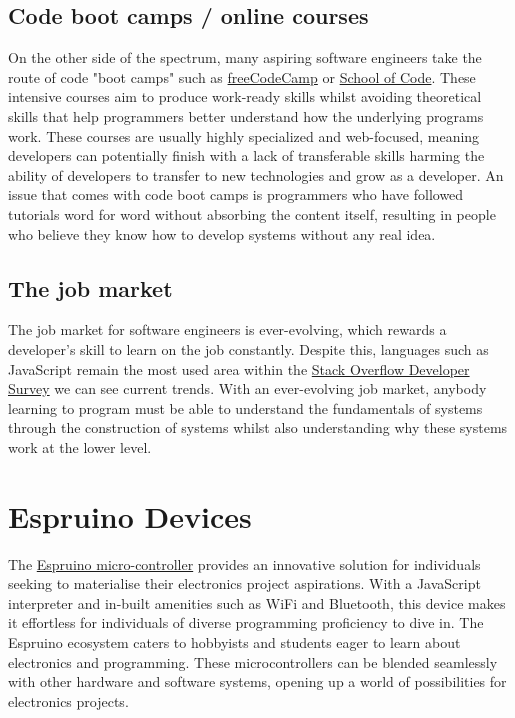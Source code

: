 \documentclass{l4proj}
\begin{document}
\subsection{Code boot camps / online courses}
On the other side of the spectrum, many aspiring software engineers take the route of code "boot camps" such as \href{https://www.freecodecamp.org/}{freeCodeCamp} or \href{https://www.schoolofcode.co.uk/}{School of Code}. These intensive courses aim to produce work-ready skills whilst avoiding theoretical skills that help programmers better understand how the underlying programs work. These courses are usually highly specialized and web-focused, meaning developers can potentially finish with a lack of transferable skills harming the ability of developers to transfer to new technologies and grow as a developer. An issue that comes with code boot camps is programmers who have followed tutorials word for word without absorbing the content itself, resulting in people who believe they know how to develop systems without any real idea.

\subsection{The job market}
The job market for software engineers is ever-evolving, which rewards a developer's skill to learn on the job constantly. Despite this, languages such as JavaScript remain the most used area within the \href{https://survey.stackoverflow.co/2022/#technology-most-popular-technologies}{Stack Overflow Developer Survey} we can see current trends. With an ever-evolving job market, anybody learning to program must be able to understand the fundamentals of systems through the construction of systems whilst also understanding why these systems work at the lower level.

\section{Espruino Devices}
\text 
The \href{https://www.espruino.com/}{Espruino micro-controller} provides an innovative solution for individuals seeking to materialise their electronics project aspirations. With a JavaScript interpreter and in-built amenities such as WiFi and Bluetooth, this device makes it effortless for individuals of diverse programming proficiency to dive in. The Espruino ecosystem caters to hobbyists and students eager to learn about electronics and programming. These microcontrollers can be blended seamlessly with other hardware and software systems, opening up a world of possibilities for electronics projects.
\end{document}
